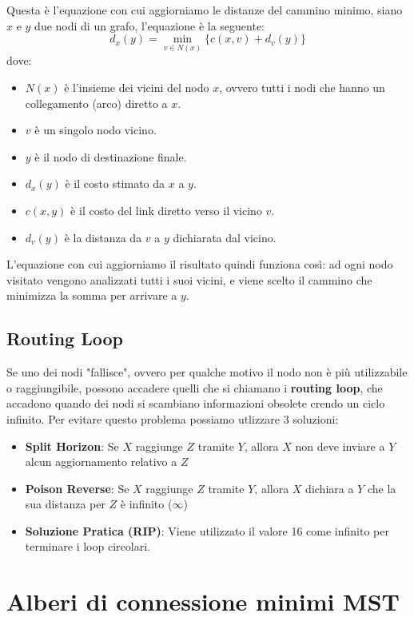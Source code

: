 \noindent Questa è l'equazione con cui aggiorniamo le distanze del cammino minimo, siano $x$ e $y$ due nodi di un grafo,
l'equazione è la seguente:
\[ d_x (y) = \underset{v \in N(x)}{\min} \{ c(x, v)+ d_v (y)\}  \]
dove:
\begin{itemize}
    \item $N(x)$ è l'insieme dei vicini del nodo $x$, ovvero tutti i nodi che hanno un collegamento (arco) diretto a $x$.
    \item $v$ è un singolo nodo vicino.
    \item $y$ è il nodo di destinazione finale.
    \item $d_x(y)$ è il costo stimato da $x$ a $y$.
    \item $c(x,y)$ è il costo del link diretto verso il vicino $v$.
    \item $d_v(y)$ è la distanza da $v$ a $y$ dichiarata dal vicino. 
\end{itemize}

\noindent L'equazione con cui aggiorniamo il risultato quindi funziona così: ad ogni nodo visitato vengono analizzati 
tutti i suoi vicini, e viene scelto il cammino che minimizza la somma per arrivare a $y$.

\subsection{Routing Loop}
Se uno dei nodi "fallisce", ovvero per qualche motivo il nodo non è più utilizzabile o raggiungibile, possono accadere quelli che si chiamano i \textbf{routing loop}, che accadono quando 
dei nodi si scambiano informazioni obsolete crendo un ciclo infinito. Per evitare questo problema possiamo utlizzare 3 soluzioni:
\begin{itemize}
    \item \textbf{Split Horizon}: Se $X$ raggiunge $Z$ tramite $Y$, allora $X$ non deve inviare a $Y$ alcun aggiornamento relativo a $Z$
    \item \textbf{Poison Reverse}: Se $X$ raggiunge $Z$ tramite $Y$, allora $X$ dichiara a $Y$ che la sua distanza per $Z$ è infinito ($\infty$)
    \item \textbf{Soluzione Pratica (RIP)}: Viene utilizzato il valore 16 come infinito per terminare i loop circolari.
\end{itemize} 

\section{Alberi di connessione minimi MST}
